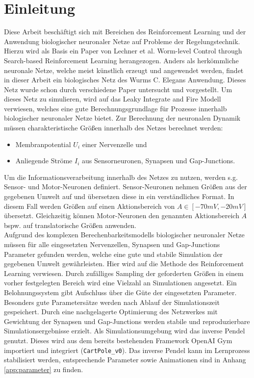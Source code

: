 %
\chapter{Einleitung}
\label{chap:einleitung}
%

	Diese Arbeit beschäftigt sich mit Bereichen des Reinforcement Learning und der Anwendung biologischer neuronaler Netze auf Probleme der Regelungstechnik.\\
	Hierzu wird als Basis ein Paper von Lechner et al. \glqq Worm-level Control through Search-based Reinforcement Learning\grqq{} \cite{WormLevelRL} herangezogen. Anders als herkömmliche neuronale Netze, welche meist künstlich erzeugt und angewendet werden, findet in dieser Arbeit ein biologisches Netz des Wurms C. Elegans Anwendung. Dieses Netz wurde schon durch verschiedene Paper \cite{CElegans} \cite{SimCE} \cite{Wicks1996} untersucht und vorgestellt. Um dieses Netz zu simulieren, wird auf das Leaky Integrate and Fire Modell verwiesen, welches eine gute Berechnungsgrundlage für Prozesse innerhalb biologischer neuronaler Netze bietet. Zur Berechnung der neuronalen Dynamik müssen charakteristische Größen innerhalb des Netzes berechnet werden:
	\begin{itemize}
		\item Membranpotential $U_i$ einer Nervenzelle und
		\item Anliegende Ströme $I_i$ aus Sensorneuronen, Synapsen und Gap-Junctions.
	\end{itemize}
	Um die Informationsverarbeitung innerhalb des Netzes zu nutzen, werden s.g. Sensor- und Motor-Neuronen definiert. Sensor-Neuronen nehmen Größen aus der gegebenen Umwelt auf und übersetzen diese in ein verständliches Format. In diesem Fall werden Größen auf einen Aktionsbereich von $A \in [-70mV, -20mV]$ übersetzt. Gleichzeitig können Motor-Neuronen den genannten Aktionsbereich $A$ bspw. auf translatorische Größen anwenden.\\
	Aufgrund des komplexen Berechenbarkeitsmodells biologischer neuronaler Netze müssen für alle eingesetzten Nervenzellen, Synapsen und Gap-Junctions Parameter gefunden werden, welche eine gute und stabile Simulation der gegebenen Umwelt gewährleisten. Hier wird auf die Methode des Reinforcement Learning verwiesen. Durch zufälliges Sampling der geforderten Größen in einem vorher festgelegten Bereich wird eine Vielzahl an Simulationen angesetzt. Ein Belohnungssystem gibt Aufschluss über die Güte der eingesetzten Parameter. Besonders gute Parametersätze werden nach Ablauf der Simulationszeit gespeichert. Durch eine nachgelagerte Optimierung des Netzwerkes mit Gewichtung der Synapsen und Gap-Junctions werden stabile und reproduzierbare Simulationsergebnisse erzielt. Als Simulationsumgebung wird das inverse Pendel genutzt. Dieses wird aus dem bereits bestehenden Framework OpenAI Gym importiert und integriert (\texttt{CartPole\_v0}). Das inverse Pendel kann im Lernprozess stabilisiert werden, entsprechende Parameter sowie Animationen sind in Anhang \ref{app:parameter} zu finden.

